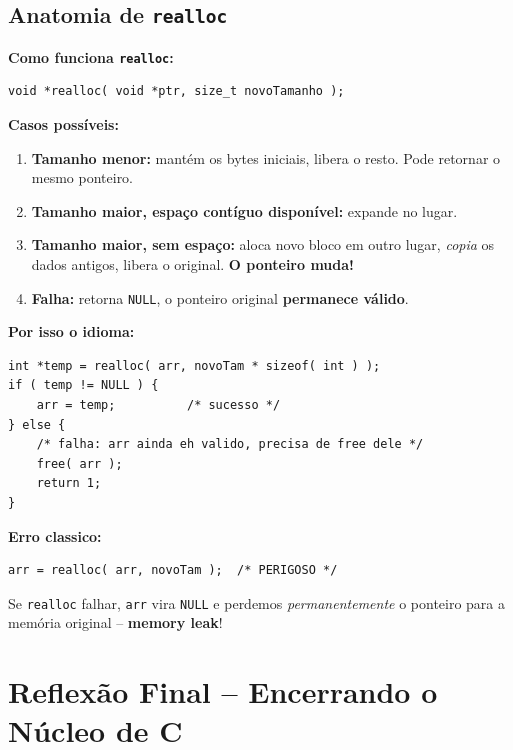 \documentclass[12pt,a4paper]{article}
\begin{document}
\subsection*{Anatomia de \texttt{realloc}}

\begin{boaprática}
\textbf{Como funciona \texttt{realloc}:}
\begin{lstlisting}
void *realloc( void *ptr, size_t novoTamanho );
\end{lstlisting}

\textbf{Casos possíveis:}
\begin{enumerate}[noitemsep]
  \item \textbf{Tamanho menor:} mantém os bytes iniciais, libera o resto.
  Pode retornar o mesmo ponteiro.
  \item \textbf{Tamanho maior, espaço contíguo disponível:} expande no lugar.
  \item \textbf{Tamanho maior, sem espaço:} aloca novo bloco em outro lugar,
  \textit{copia} os dados antigos, libera o original. \textbf{O ponteiro muda!}
  \item \textbf{Falha:} retorna \texttt{NULL}, o ponteiro original \textbf{permanece válido}.
\end{enumerate}

\textbf{Por isso o idioma:}
\begin{lstlisting}
int *temp = realloc( arr, novoTam * sizeof( int ) );
if ( temp != NULL ) {
    arr = temp;          /* sucesso */
} else {
    /* falha: arr ainda eh valido, precisa de free dele */
    free( arr );
    return 1;
}
\end{lstlisting}

\begin{erroco}
\textbf{Erro classico:}
\begin{lstlisting}
arr = realloc( arr, novoTam );  /* PERIGOSO */
\end{lstlisting}
Se \texttt{realloc} falhar, \texttt{arr} vira \texttt{NULL} e perdemos
\textit{permanentemente} o ponteiro para a memória original -- \textbf{memory leak}!
\end{erroco}
\end{boaprática}

\newpage

\section*{Reflexão Final -- Encerrando o Núcleo de C}
\end{document}

